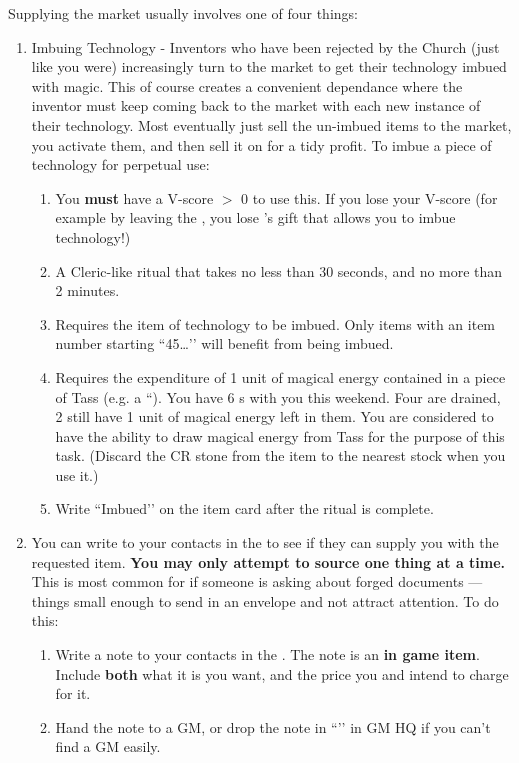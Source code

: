 \documentclass[green]{GL2020}
\begin{document}
Supplying the market usually involves one of four things:
\begin{enumerate}
  \item Imbuing Technology - Inventors who have been rejected by the Church (just like you were) increasingly turn to the market to get their technology imbued with magic. This of course creates a convenient dependance where the inventor must keep coming back to the market with each new instance of their technology. Most eventually just sell the un-imbued items to the market, you activate them, and then sell it on for a tidy profit. To imbue a piece of technology for perpetual use:
  \begin{enumerate}
    \item You \textbf{must} have a V-score $>$ 0 to use this. If you lose your V-score (for example by leaving the \pGoaties{}, you lose \cGenesis{}’s gift that allows you to imbue technology!)
    \item A Cleric-like ritual that takes no less than 30 seconds, and no more than 2 minutes.
    \item Requires the item of technology to be imbued. Only items with an item number starting ``45…’’ will benefit from being imbued.
    \item Requires the expenditure of 1 unit of magical energy contained in a piece of Tass (e.g. a ``\iChargingStone{}). You have 6 \iChargingStone{\MYname}s with you this weekend. Four are drained, 2 still have 1 unit of magical energy left in them.  You are considered to have the ability to draw magical energy from Tass for the purpose of this task. (Discard the CR stone from the item to the nearest stock when you use it.)
    \item Write ``Imbued’’ on the item card after the ritual is complete.
  \end{enumerate}
  \item You can write to your contacts in the \pTech{} to see if they can supply you with the requested item. \textbf{You may only attempt to source one thing at a time.} This is most common for if someone is asking about forged documents — things small enough to send in an envelope and not attract attention. To do this:
  \begin{enumerate}
    \item Write a note to your contacts in the \pTech{}. The note is an \textbf{in game item}. Include \textbf{both} what it is you want, and the price you and \cChupSecond{} intend to charge for it.
    \item Hand the note to a GM, or drop the note in ``\sSignR{}’’ in GM HQ if you can’t find a GM easily.

\end{enumerate}
\end{enumerate}
\end{document}
